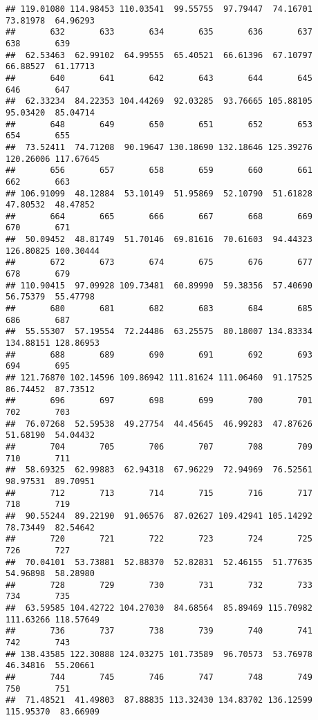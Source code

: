 \documentclass[
]{article}
\begin{document}
\begin{verbatim}
## 119.01080 114.98453 110.03541  99.55755  97.79447  74.16701  73.81978  64.96293 
##       632       633       634       635       636       637       638       639 
##  62.53463  62.99102  64.99555  65.40521  66.61396  67.10797  66.88527  61.17713 
##       640       641       642       643       644       645       646       647 
##  62.33234  84.22353 104.44269  92.03285  93.76665 105.88105  95.03420  85.04714 
##       648       649       650       651       652       653       654       655 
##  73.52411  74.71208  90.19647 130.18690 132.18646 125.39276 120.26006 117.67645 
##       656       657       658       659       660       661       662       663 
## 106.91099  48.12884  53.10149  51.95869  52.10790  51.61828  47.80532  48.47852 
##       664       665       666       667       668       669       670       671 
##  50.09452  48.81749  51.70146  69.81616  70.61603  94.44323 126.80825 100.30444 
##       672       673       674       675       676       677       678       679 
## 110.90415  97.09928 109.73481  60.89990  59.38356  57.40690  56.75379  55.47798 
##       680       681       682       683       684       685       686       687 
##  55.55307  57.19554  72.24486  63.25575  80.18007 134.83334 134.88151 128.86953 
##       688       689       690       691       692       693       694       695 
## 121.76870 102.14596 109.86942 111.81624 111.06460  91.17525  86.74452  87.73512 
##       696       697       698       699       700       701       702       703 
##  76.07268  52.59538  49.27754  44.45645  46.99283  47.87626  51.68190  54.04432 
##       704       705       706       707       708       709       710       711 
##  58.69325  62.99883  62.94318  67.96229  72.94969  76.52561  98.97531  89.70951 
##       712       713       714       715       716       717       718       719 
##  90.55244  89.22190  91.06576  87.02627 109.42941 105.14292  78.73449  82.54642 
##       720       721       722       723       724       725       726       727 
##  70.04101  53.73881  52.88370  52.82831  52.46155  51.77635  54.96898  58.28980 
##       728       729       730       731       732       733       734       735 
##  63.59585 104.42722 104.27030  84.68564  85.89469 115.70982 111.63266 118.57649 
##       736       737       738       739       740       741       742       743 
## 138.43585 122.30888 124.03275 101.73589  96.70573  53.76978  46.34816  55.20661 
##       744       745       746       747       748       749       750       751 
##  71.48521  41.49803  87.88835 113.32430 134.83702 136.12599 115.95370  83.66909 

\end{verbatim}
\end{document}
